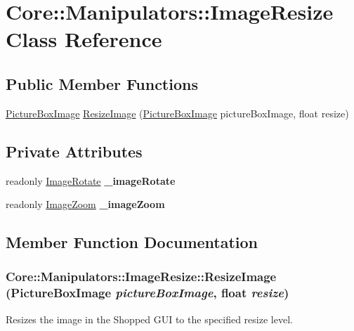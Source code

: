 \hypertarget{class_core_1_1_manipulators_1_1_image_resize}{
\section{Core::Manipulators::ImageResize Class Reference}
\label{class_core_1_1_manipulators_1_1_image_resize}
}
\subsection*{Public Member Functions}
\begin{DoxyCompactItemize}
\item 
\hyperlink{class_core_1_1_images_1_1_picture_box_image}{PictureBoxImage} \hyperlink{class_core_1_1_manipulators_1_1_image_resize_a5e36f234fa006a6ce9de380e8fe32798}{ResizeImage} (\hyperlink{class_core_1_1_images_1_1_picture_box_image}{PictureBoxImage} pictureBoxImage, float resize)
\end{DoxyCompactItemize}
\subsection*{Private Attributes}
\begin{DoxyCompactItemize}
\item 
\hypertarget{class_core_1_1_manipulators_1_1_image_resize_acf11a70fb6a5bc28bf19b50d3d23a5d5}{
readonly \hyperlink{class_core_1_1_manipulators_1_1_image_rotate}{ImageRotate} {\bfseries \_\-imageRotate}}
\label{class_core_1_1_manipulators_1_1_image_resize_acf11a70fb6a5bc28bf19b50d3d23a5d5}

\item 
\hypertarget{class_core_1_1_manipulators_1_1_image_resize_ab3a931bb3a1250daba797e06fd4568e3}{
readonly \hyperlink{class_core_1_1_manipulators_1_1_image_zoom}{ImageZoom} {\bfseries \_\-imageZoom}}
\label{class_core_1_1_manipulators_1_1_image_resize_ab3a931bb3a1250daba797e06fd4568e3}

\end{DoxyCompactItemize}


\subsection{Member Function Documentation}
\hypertarget{class_core_1_1_manipulators_1_1_image_resize_a5e36f234fa006a6ce9de380e8fe32798}{
\subsubsection[{ResizeImage}]{ Core::Manipulators::ImageResize::ResizeImage ({\bf PictureBoxImage} {\em pictureBoxImage}, \/  float {\em resize})}}
\label{class_core_1_1_manipulators_1_1_image_resize_a5e36f234fa006a6ce9de380e8fe32798}
Resizes the image in the Shopped GUI to the specified resize level.


